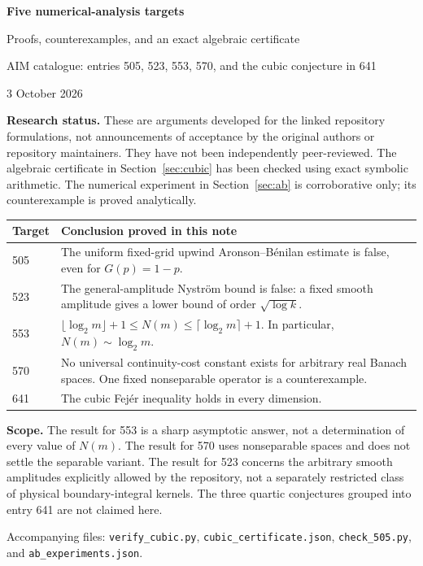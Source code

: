 \documentclass[11pt,a4paper]{article}
\theoremstyle{remark}
\begin{document}
\begin{titlepage}
\vspace*{16mm}
{\Large\bfseries Five numerical-analysis targets\par}
\par\vspace{4mm}
{\large Proofs, counterexamples, and an exact algebraic certificate\par}
\par\vspace{10mm}
{\large AIM catalogue: entries 505, 523, 553, 570, and the cubic conjecture in 641\par}
\par\vspace{8mm}
3 October 2026\par
\par\vspace{13mm}
\textbf{Research status.} These are arguments developed for the linked repository formulations, not announcements of acceptance by the original authors or repository maintainers. They have not been independently peer-reviewed. The algebraic certificate in Section~\ref{sec:cubic} has been checked using exact symbolic arithmetic. The numerical experiment in Section~\ref{sec:ab} is corroborative only; its counterexample is proved analytically.
\par\vspace{7mm}
\begin{tabular}{@{}p{14mm}p{128mm}@{}}
\toprule
Target & Conclusion proved in this note\\
\midrule
505 & The uniform fixed-grid upwind Aronson--B\'enilan estimate is false, even for $G(p)=1-p$.\\[3pt]
523 & The general-amplitude Nystr\"om bound is false: a fixed smooth amplitude gives a lower bound of order $\sqrt{\log k}$.\\[3pt]
553 & $\lfloor\log_2m\rfloor+1\le N(m)\le\lceil\log_2m\rceil+1$. In particular, $N(m)\sim\log_2m$.\\[3pt]
570 & No universal continuity-cost constant exists for arbitrary real Banach spaces. One fixed nonseparable operator is a counterexample.\\[3pt]
641 & The cubic Fej\'er inequality holds in every dimension.\\
\bottomrule
\end{tabular}\par
\par\vspace{7mm}
\textbf{Scope.} The result for 553 is a sharp asymptotic answer, not a determination of every value of $N(m)$. The result for 570 uses nonseparable spaces and does not settle the separable variant. The result for 523 concerns the arbitrary smooth amplitudes explicitly allowed by the repository, not a separately restricted class of physical boundary-integral kernels. The three quartic conjectures grouped into entry 641 are not claimed here.
\par\vfill
\small Accompanying files: \texttt{verify\_cubic.py}, \texttt{cubic\_certificate.json},\newline
\texttt{check\_505.py}, and \texttt{ab\_experiments.json}.
\end{titlepage}
\end{document}
